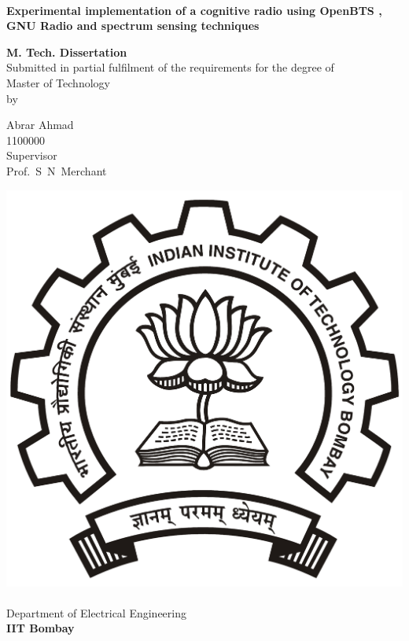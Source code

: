 \begin{titlepage}
\begin{center}
\begin{spacing}{1.0}


~\\[0.3cm]
{ \LARGE \bfseries Experimental implementation of a cognitive radio using OpenBTS , GNU Radio and spectrum sensing techniques\\[1.2cm] }

\textbf{\large M. Tech. Dissertation}\\[1.2cm]

{Submitted in partial fulfilment of the requirements for the degree of\\[0.1cm]
Master of Technology\\[0.3cm]
by\\[0.3cm]}

{\LARGE Abrar Ahmad\\[0.1cm]}
{1100000\\[1.1cm]}
{Supervisor\\[0.1cm]}
{\LARGE Prof.~S~N~Merchant\\[1.3cm]}

\includegraphics[width=0.21\textheight]{iitbLogo}~\\[0.9cm]
Department of Electrical Engineering\\[0.2cm]
\textbf{\large IIT Bombay}\\[1.3cm]


\end{spacing}
\end{center}
\end{titlepage}
